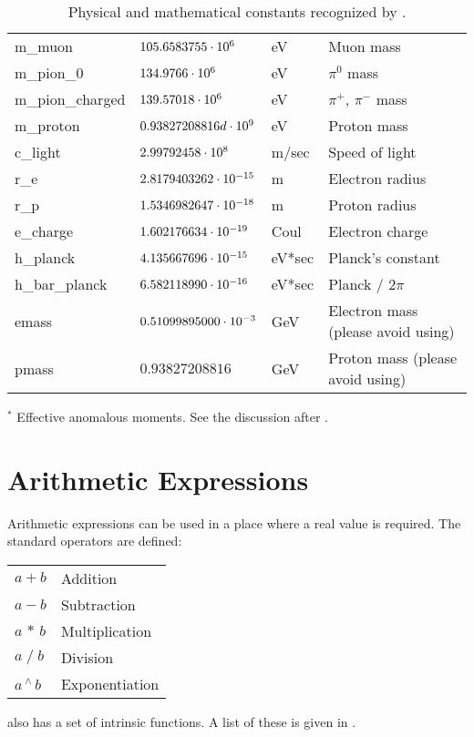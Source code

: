 {{{\begin{table}[h]
\begin{tabular}{llll}
  m_muon                & $105.6583755 \cdot 10^{6}$      & eV          & Muon mass             \\
  m_pion_0              & $134.9766 \cdot 10^{6}$         & eV          & $\pi^0$ mass          \\
  m_pion_charged        & $139.57018 \cdot 10^{6}$        & eV          & $\pi^+$, $\pi^-$ mass \\
  m_proton              & $0.93827208816d \cdot 10^{9}$   & eV          & Proton mass           \\
  c_light               & $2.99792458 \cdot 10^{8}$       & m/sec       & Speed of light        \\
  r_e                   & $2.8179403262 \cdot 10^{-15}$   & m           & Electron radius       \\
  r_p                   & $1.5346982647 \cdot 10^{-18}$   & m           & Proton radius         \\
  e_charge              & $1.602176634 \cdot 10^{-19}$    & Coul        & Electron charge       \\
  h_planck              & $4.135667696 \cdot 10^{-15}$    & eV*sec      & Planck's constant     \\
  h_bar_planck          & $6.582118990 \cdot 10^{-16}$    & eV*sec      & Planck / $2\pi$       \\
  emass                 & $0.51099895000 \cdot 10^{-3}$   & GeV         & Electron mass (please avoid using)   \\
  pmass                 & $0.93827208816$            & GeV         & Proton mass (please avoid using)     \\ \bottomrule
\end{tabular}
$^*$ Effective anomalous moments. See the discussion after .
\caption{Physical and mathematical constants recognized by \bmad.}
\label{t:constants}
\end{table}

\section{Arithmetic Expressions}
\label{s:arith}

Arithmetic expressions can be used in a place where a real value is required.
The standard operators are defined: \hfil\break
\hspace*{0.15in}
\begin{tabular}{ll}
  $a + b$           & Addition        \\
  $a - b$           & Subtraction     \\
  $a \, \ast \, b$  & Multiplication  \\
  $a \; / \; b$     & Division        \\
  $a \, ^{\scriptstyle\wedge} \, b$ & Exponentiation  \\
\end{tabular}
\hfil\break
\bmad also has a set of intrinsic functions. A list of these is given
in .

}}}
